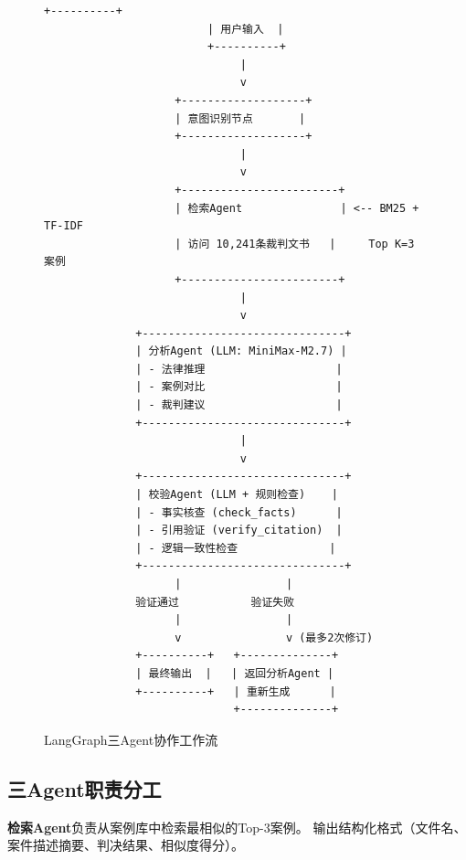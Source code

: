 \documentclass[12pt,a4paper,twoside]{ctexart}
\begin{document}
\begin{figure}[H]
\centering
\begin{tcolorbox}[colback=codebg,colframe=codeframe,boxrule=0.5pt,arc=4pt]
\begin{lstlisting}[basicstyle=\small\ttfamily,frame=none,backgroundcolor={}]
                         +----------+
                         | 用户输入  |
                         +----------+
                              |
                              v
                    +-------------------+
                    | 意图识别节点       |
                    +-------------------+
                              |
                              v
                    +------------------------+
                    | 检索Agent               | <-- BM25 + TF-IDF
                    | 访问 10,241条裁判文书   |     Top K=3 案例
                    +------------------------+
                              |
                              v
              +-------------------------------+
              | 分析Agent (LLM: MiniMax-M2.7) |
              | - 法律推理                    |
              | - 案例对比                    |
              | - 裁判建议                    |
              +-------------------------------+
                              |
                              v
              +-------------------------------+
              | 校验Agent (LLM + 规则检查)    |
              | - 事实核查 (check_facts)      |
              | - 引用验证 (verify_citation)  |
              | - 逻辑一致性检查              |
              +-------------------------------+
                    |                |
              验证通过           验证失败
                    |                |
                    v                v (最多2次修订)
              +----------+   +--------------+
              | 最终输出  |   | 返回分析Agent |
              +----------+   | 重新生成      |
                             +--------------+
\end{lstlisting}
\end{tcolorbox}
\caption{LangGraph三Agent协作工作流}
\label{fig:langgraph}
\end{figure}

\subsection{三Agent职责分工}

\textbf{检索Agent}负责从案例库中检索最相似的Top-3案例。
输出结构化格式（文件名、案件描述摘要、判决结果、相似度得分）。
\end{document}
